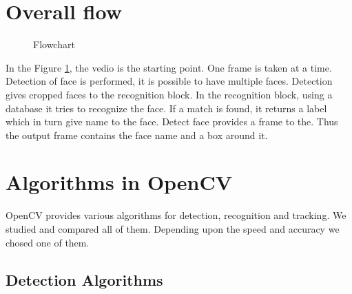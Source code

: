 \documentclass[conference]{IEEEtran}
\begin{document}
\section{Overall flow}
\begin{figure}[h!]
	\centering
	\caption{Flowchart}
	\label{flow}
\end{figure}
In the Figure \ref{flow}, the vedio is the starting point. One frame is taken at a time. Detection of face is performed, it is possible to have multiple faces. Detection gives cropped faces to the recognition block. In the recognition block, using a database it tries to recognize the face. If a match is found, it returns a label which in turn give name to the face. Detect face provides a frame to the. Thus the output frame contains the face name and a box around it.

\section{Algorithms in OpenCV}
OpenCV provides various algorithms for detection, recognition and tracking. We studied and compared all of them. Depending upon the speed and accuracy we chosed one of them.

\subsection{Detection Algorithms}
\end{document}
